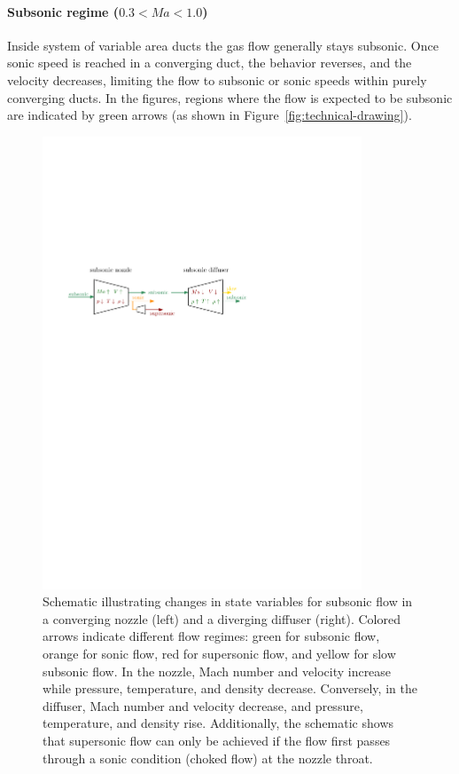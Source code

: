 	\paragraph{Subsonic regime ($0.3 < Ma < 1.0$)} 
		Inside system of variable area ducts the gas flow generally stays subsonic.
		Once sonic speed is reached in a converging duct, the behavior reverses, and the velocity decreases, limiting the flow to subsonic or sonic speeds within purely converging ducts.
		In the figures, regions where the flow is expected to be subsonic are indicated by green arrows (as shown in Figure~\ref{fig:technical-drawing}).\\
		\begin{figure}[H]
		    \centering
		    \includegraphics[width=0.85\textwidth]{src/02_foundations/fig_variable-change-subsonic.pdf}
			\caption{
				Schematic illustrating changes in state variables for subsonic flow in a 
				converging nozzle (left) and a diverging diffuser (right).
				Colored arrows indicate different flow regimes: green for subsonic flow, orange for sonic flow, red for supersonic flow, and yellow for slow subsonic flow.
				In the nozzle, Mach number and velocity increase while pressure, temperature, and density decrease.
				Conversely, in the diffuser, Mach number and velocity decrease, and pressure, temperature, and density rise.
				Additionally, the schematic shows that supersonic flow can only be achieved if the flow first passes through a sonic condition (choked flow) at the nozzle throat.
				\cite{Cengel2017}
			}
		\end{figure}

